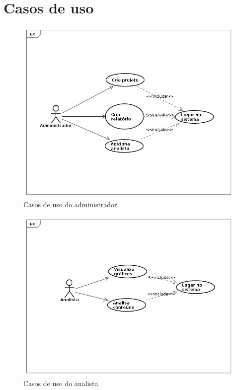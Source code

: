 \section{Casos de uso}

\begin{figure}[hb]
    \begin{center}
        \includegraphics[scale=0.5]{img/caso-uso-administrador.png}
        \caption{Casos de uso do administrador}
        \label{fig:caso-uso-administrador}
    \end{center}
\end{figure}

\begin{figure}[hb]
    \begin{center}
        \includegraphics[scale=0.5]{img/caso-uso-analista.png}
        \caption{Casos de uso do analista}
        \label{fig:caso-uso-analista}
    \end{center}
\end{figure}

